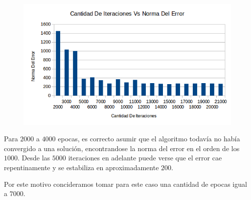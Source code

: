 \begin{figure}[h!]
  \centering
    \includegraphics[scale=0.4]{ej2/test_iteraciones.png}
\end{figure}

Para $2000$ a $4000$ epocas, es correcto asumir que el algoritmo todavía no había convergido a una solución, encontrandose la norma del error en el orden de los $1000$. Desde las $5000$ iteraciones en adelante puede verse que el error cae repentinamente y se estabiliza en aproximadamente $200$.  

Por este motivo concideramos tomar para este caso una cantidad de epocas igual a $7000$.

